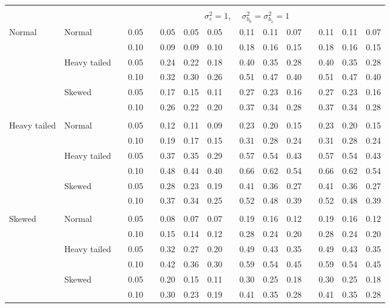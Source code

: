 \documentclass[11pt]{article} %
\begin{document}
\begin{table}[ht]
\begin{scriptsize}
\begin{center}
\begin{tabular}{ll p{.1cm} c p{.1cm} rrr p{.1cm} rrr p{.1cm} rrr}
&&&&&&&&&&&&&&&\\
& && && \multicolumn{9}{c}{$\sigma_{\varepsilon}^2 = 1$, \ \ $\sigma_{b_0}^2 = \sigma_{b_1}^2 = 1$} \\ \cline{6-16}
Normal       & Normal       && 0.05 &&  0.05 & 0.05 & 0.05 && 0.11 & 0.11 & 0.07 && 0.11 & 0.11 & 0.07 \\ 
             &              && 0.10 &&  0.09 & 0.09 & 0.10 && 0.18 & 0.16 & 0.15 && 0.18 & 0.16 & 0.15 \\ 
             & Heavy tailed && 0.05 &&  0.24 & 0.22 & 0.18 && 0.40 & 0.35 & 0.28 && 0.40 & 0.35 & 0.28 \\ 
             &              && 0.10 &&  0.32 & 0.30 & 0.26 && 0.51 & 0.47 & 0.40 && 0.51 & 0.47 & 0.40 \\ 
             & Skewed       && 0.05 &&  0.17 & 0.15 & 0.11 && 0.27 & 0.23 & 0.16 && 0.27 & 0.23 & 0.16 \\ 
             &              && 0.10 &&  0.26 & 0.22 & 0.20 && 0.37 & 0.34 & 0.28 && 0.37 & 0.34 & 0.28 \\ 
             &&&&&&&&&&&&&&&\\
Heavy tailed & Normal       && 0.05 &&  0.12 & 0.11 & 0.09 && 0.23 & 0.20 & 0.15 && 0.23 & 0.20 & 0.15 \\ 
             &              && 0.10 &&  0.19 & 0.17 & 0.15 && 0.31 & 0.28 & 0.24 && 0.31 & 0.28 & 0.24 \\ 
             & Heavy tailed && 0.05 &&  0.37 & 0.35 & 0.29 && 0.57 & 0.54 & 0.43 && 0.57 & 0.54 & 0.43 \\ 
             &              && 0.10 &&  0.48 & 0.44 & 0.40 && 0.66 & 0.62 & 0.54 && 0.66 & 0.62 & 0.54 \\ 
             & Skewed       && 0.05 &&  0.28 & 0.23 & 0.19 && 0.41 & 0.36 & 0.27 && 0.41 & 0.36 & 0.27 \\ 
             &              && 0.10 &&  0.37 & 0.34 & 0.25 && 0.52 & 0.48 & 0.39 && 0.52 & 0.48 & 0.39 \\ 
             &&&&&&&&&&&&&&&\\
Skewed       & Normal       && 0.05 &&  0.08 & 0.07 & 0.07 && 0.19 & 0.16 & 0.12 && 0.19 & 0.16 & 0.12 \\ 
             &              && 0.10 &&  0.15 & 0.14 & 0.12 && 0.28 & 0.24 & 0.20 && 0.28 & 0.24 & 0.20 \\ 
             & Heavy tailed && 0.05 &&  0.32 & 0.27 & 0.20 && 0.49 & 0.43 & 0.35 && 0.49 & 0.43 & 0.35 \\ 
             &              && 0.10 &&  0.42 & 0.36 & 0.30 && 0.59 & 0.54 & 0.45 && 0.59 & 0.54 & 0.45 \\ 
             & Skewed       && 0.05 &&  0.20 & 0.15 & 0.11 && 0.30 & 0.25 & 0.18 && 0.30 & 0.25 & 0.18 \\ 
             &              && 0.10 &&  0.30 & 0.23 & 0.19 && 0.41 & 0.35 & 0.28 && 0.41 & 0.35 & 0.28 \\ 



\end{tabular}
\end{center}
\end{scriptsize}
\end{table}
\end{document}
